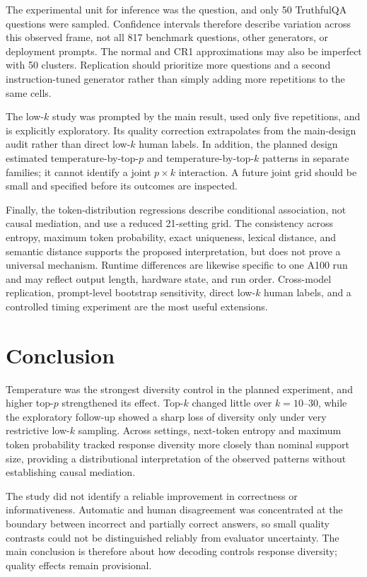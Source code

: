 \documentclass[11pt]{article}
\begin{document}
The experimental unit for inference was the question, and only 50 TruthfulQA
questions were sampled. Confidence intervals therefore describe variation
across this observed frame, not all 817 benchmark questions, other generators,
or deployment prompts. The normal and CR1 approximations may also be imperfect
with 50 clusters. Replication should prioritize more questions and a second
instruction-tuned generator rather than simply adding more repetitions to the
same cells.

The low-$k$ study was prompted by the main result, used only five repetitions,
and is explicitly exploratory. Its quality correction extrapolates from the
main-design audit rather than direct low-$k$ human labels. In addition, the
planned design estimated temperature-by-top-$p$ and temperature-by-top-$k$
patterns in separate families; it cannot identify a joint $p\times k$
interaction. A future joint grid should be small and specified before its
outcomes are inspected.

Finally, the token-distribution regressions describe conditional association,
not causal mediation, and use a reduced 21-setting grid. The consistency across
entropy, maximum token probability, exact uniqueness, lexical distance, and
semantic distance supports the proposed interpretation, but does not prove a
universal mechanism. Runtime differences are likewise specific to one A100 run
and may reflect output length, hardware state, and run order. Cross-model
replication, prompt-level bootstrap sensitivity, direct low-$k$ human labels,
and a controlled timing experiment are the most useful extensions.

\section{Conclusion}

Temperature was the strongest diversity control in the planned experiment, and
higher top-$p$ strengthened its effect. Top-$k$ changed little over $k=10$--30,
while the exploratory follow-up showed a sharp loss of diversity only under
very restrictive low-$k$ sampling. Across settings, next-token entropy and
maximum token probability tracked response diversity more closely than nominal
support size, providing a distributional interpretation of the observed
patterns without establishing causal mediation.

The study did not identify a reliable improvement in correctness or
informativeness. Automatic and human disagreement was concentrated at the
boundary between incorrect and partially correct answers, so small quality
contrasts could not be distinguished reliably from evaluator uncertainty. The
main conclusion is therefore about how decoding controls response diversity;
quality effects remain provisional.
\end{document}
